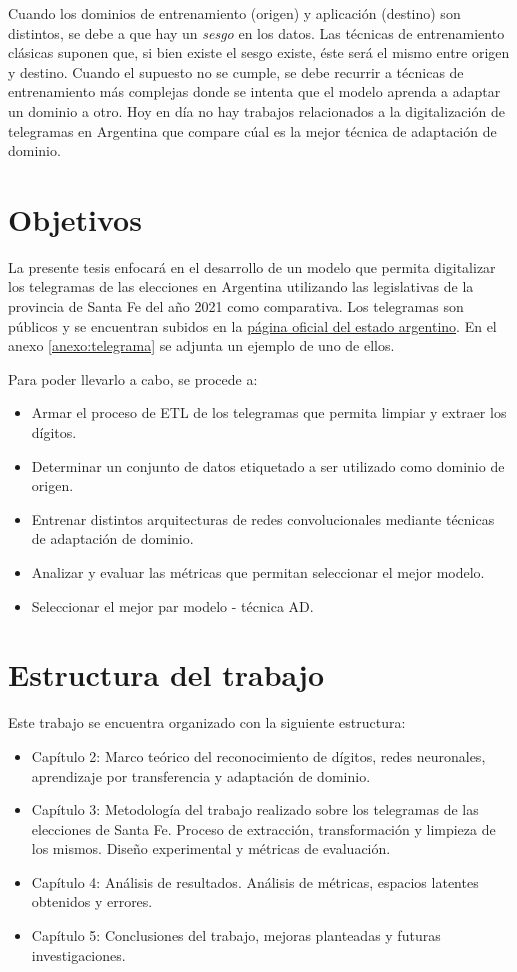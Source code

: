 Cuando los dominios de entrenamiento (origen) y aplicaci\'on (destino) son distintos, se debe a que hay un {\it sesgo}
en los datos. Las t\'ecnicas de entrenamiento cl\'asicas suponen que, si bien existe el sesgo existe, \'este ser\'a el
mismo entre origen y destino. Cuando el supuesto no se cumple, se debe recurrir a t\'ecnicas de entrenamiento m\'as
complejas donde se intenta que el modelo aprenda a adaptar un dominio a otro. Hoy en d\'ia no hay trabajos relacionados
a la digitalizaci\'on de telegramas en Argentina que compare c\'ual es la mejor t\'ecnica de adaptaci\'on de dominio.

\section{Objetivos}

La presente tesis enfocar\'a en el desarrollo de un modelo que permita digitalizar los telegramas de las elecciones en
Argentina utilizando las legislativas de la provincia de Santa Fe del a\~{n}o 2021 como comparativa. Los telegramas son
p\'ublicos y se encuentran subidos en la \href{https://op.elecciones.gob.ar/telegramas/generales2021/}{p\'agina oficial
    del estado argentino}. En el anexo \ref{anexo:telegrama} se adjunta un ejemplo de uno de ellos.

Para poder llevarlo a cabo, se procede a:
\begin{itemize}
    \item Armar el proceso de ETL de los telegramas que permita limpiar y extraer los d\'igitos.
    \item Determinar un conjunto de datos etiquetado a ser utilizado como dominio de origen.
    \item Entrenar distintos arquitecturas de redes convolucionales mediante t\'ecnicas de adaptaci\'on de dominio.
    \item Analizar y evaluar las m\'etricas que permitan seleccionar el mejor modelo.
    \item Seleccionar el mejor par modelo - t\'ecnica AD.
\end{itemize}

\section{Estructura del trabajo}
Este trabajo se encuentra organizado con la siguiente estructura:

\begin{itemize}
    \item Capítulo 2: Marco teórico del reconocimiento de dígitos, redes neuronales, aprendizaje por transferencia y adaptación
          de dominio.
    \item Capítulo 3: Metodología del trabajo realizado sobre los telegramas de las elecciones de Santa Fe. Proceso de
          extracción, transformación y limpieza de los mismos. Diseño experimental y métricas de evaluación.
    \item Capítulo 4: Análisis de resultados. Análisis de métricas, espacios latentes obtenidos y errores.
    \item Capítulo 5: Conclusiones del trabajo, mejoras planteadas y futuras investigaciones.
\end{itemize}